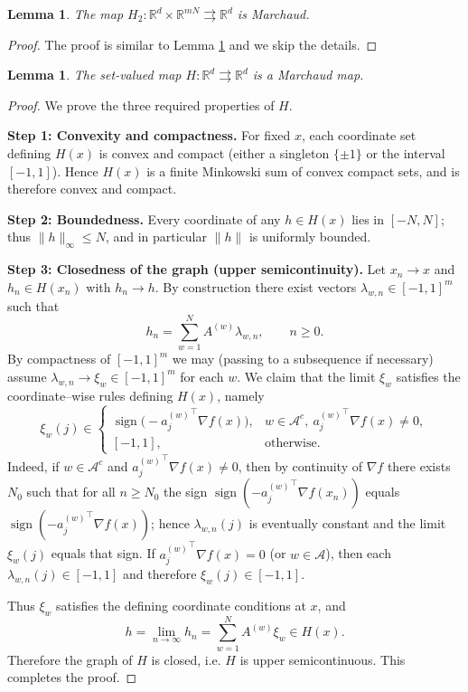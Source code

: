 \documentclass{article}
\newtheorem{lemma}[theorem]{Lemma}
\begin{document}
\begin{lemma}
    The map $H_2: \mathbb{R}^d \times \mathbb{R}^{m N} \rightrightarrows \mathbb{R}^d$ is Marchaud. 
    \label{lemmarchaud}
\end{lemma}

\begin{proof}
    The proof is similar to Lemma \ref{Marchaud} and we skip the details.
\end{proof}

\begin{lemma}
    The set-valued map $H: \mathbb{R}^d \rightrightarrows \mathbb{R}^d$ is a Marchaud map.
    \label{Marchaud}
\end{lemma}
\begin{proof}
We prove the three required properties of \(H\).

\medskip
\noindent\textbf{Step 1: Convexity and compactness.}  
For fixed \(x\), each coordinate set defining \(H(x)\) is convex and compact (either a singleton \(\{\pm1\}\) or the interval \([-1,1]\)). Hence \(H(x)\) is a finite Minkowski sum of convex compact sets, and is therefore convex and compact.

\medskip
\noindent\textbf{Step 2: Boundedness.}  
Every coordinate of any \(h\in H(x)\) lies in \([-N,N]\); thus \(\|h\|_\infty\le N\), and in particular \(\|h\|\) is uniformly bounded.

\medskip
\noindent\textbf{Step 3: Closedness of the graph (upper semicontinuity).}  
Let \(x_n\to x\) and \(h_n\in H(x_n)\) with \(h_n\to h\). By construction there exist vectors \(\lambda_{w,n}\in[-1,1]^m\) such that
\[
h_n=\sum_{w=1}^N A^{(w)}\lambda_{w,n},\qquad n\ge0.
\]
By compactness of \([-1,1]^m\) we may (passing to a subsequence if necessary) assume \(\lambda_{w,n}\to\xi_w\in[-1,1]^m\) for each \(w\). We claim that the limit \(\xi_w\) satisfies the coordinate--wise rules defining \(H(x)\), namely
\[
\xi_w(j)\in
\begin{cases}
\operatorname{sign}\!\big(-{a_j^{(w)}}^\top \nabla f(x)\big), &
w\in\mathcal A^c,\ {a_j^{(w)}}^\top \nabla f(x)\neq0,\\[4pt]
[-1,1], & \text{otherwise}.
\end{cases}
\]
Indeed, if \(w\in\mathcal A^c\) and \({a_j^{(w)}}^\top\nabla f(x)\neq0\), then by continuity of \(\nabla f\) there exists \(N_0\) such that for all \(n\ge N_0\) the sign \(\operatorname{sign}(-{a_j^{(w)}}^\top\nabla f(x_n))\) equals \(\operatorname{sign}(-{a_j^{(w)}}^\top\nabla f(x))\); hence \(\lambda_{w,n}(j)\) is eventually constant and the limit \(\xi_w(j)\) equals that sign. If \({a_j^{(w)}}^\top\nabla f(x)=0\) (or \(w\in\mathcal A\)), then each \(\lambda_{w,n}(j)\in[-1,1]\) and therefore \(\xi_w(j)\in[-1,1]\).  

Thus \(\xi_w\) satisfies the defining coordinate conditions at \(x\), and
\[
h=\lim_{n\to\infty}h_n=\sum_{w=1}^N A^{(w)}\xi_w\in H(x).
\]
Therefore the graph of \(H\) is closed, i.e. \(H\) is upper semicontinuous. This completes the proof.
\end{proof}
\end{document}

